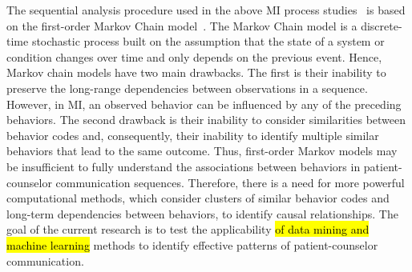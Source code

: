 \documentclass[smallextended]{svjour3}       %
\begin{document}
The sequential analysis procedure used in the above MI process studies~\cite{moyers2006therapist, catley2006adherence, thrasher2006motivational, mccambridge2011fidelity} is based on the first-order Markov Chain model~\cite{moyers2006therapist, moyers2009session, gaume2010counselor}. The Markov Chain model is a discrete-time stochastic process built on the assumption that the state of a system or condition changes over time and only depends on the previous event. Hence, Markov chain models have two main drawbacks. The first is their inability to preserve the long-range dependencies between observations in a sequence. However, in MI, an observed behavior can be influenced by any of the preceding behaviors. The second drawback is their inability to consider similarities between behavior codes and, consequently, their inability to identify multiple similar behaviors that lead to the same outcome. Thus, first-order Markov models may be insufficient to fully understand the associations between behaviors in patient-counselor communication sequences. Therefore, there is a need for more powerful computational methods, which consider clusters of similar behavior codes and long-term dependencies between behaviors, to identify causal relationships. The goal of the current research is to test the applicability \hl{of data mining and machine learning} methods to identify effective patterns of patient-counselor communication.
\end{document}
